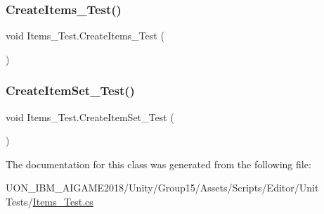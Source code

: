 \mbox{\label{class_items___test_af3d9432fd0dacf8716a1e0a50e642df3}} 
\subsubsection{\texorpdfstring{CreateItems\_Test()}{CreateItems\_Test()}}
{\footnotesize\ttfamily void Items\+\_\+\+Test.\+Create\+Items\+\_\+\+Test (\begin{DoxyParamCaption}{ }\end{DoxyParamCaption})\hspace{0.3cm}{\ttfamily [inline]}}

\mbox{\label{class_items___test_a2891c44bc7f9131017df9cddb5fc163c}} 
\subsubsection{\texorpdfstring{CreateItemSet\_Test()}{CreateItemSet\_Test()}}
{\footnotesize\ttfamily void Items\+\_\+\+Test.\+Create\+Item\+Set\+\_\+\+Test (\begin{DoxyParamCaption}{ }\end{DoxyParamCaption})\hspace{0.3cm}{\ttfamily [inline]}}



The documentation for this class was generated from the following file\+:\begin{DoxyCompactItemize}
\item 
U\+O\+N\+\_\+\+I\+B\+M\+\_\+\+A\+I\+G\+A\+M\+E2018/\+Unity/\+Group15/\+Assets/\+Scripts/\+Editor/\+Unit Tests/\mbox{\hyperlink{_items___test_8cs}{Items\+\_\+\+Test.\+cs}}\end{DoxyCompactItemize}
